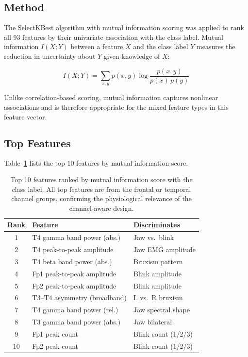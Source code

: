 \subsection{Method}

The SelectKBest algorithm with mutual information scoring
was applied to rank all 93 features by their univariate
association with the class label. Mutual information
$I(X; Y)$ between a feature $X$ and the class label $Y$
measures the reduction in uncertainty about $Y$ given
knowledge of $X$:

\begin{equation}
I(X; Y) = \sum_{x, y} p(x, y) \log
\frac{p(x, y)}{p(x)\,p(y)}
\label{eq:mutual_info}
\end{equation}

Unlike correlation-based scoring, mutual information
captures nonlinear associations and is therefore appropriate
for the mixed feature types in this feature vector.

\subsection{Top Features}

Table~\ref{tab:top_features} lists the top 10 features by
mutual information score.

\begin{table}[htbp]
\centering
\caption{Top 10 features ranked by mutual information score
with the class label. All top features are from the frontal
or temporal channel groups, confirming the physiological
relevance of the channel-aware design.}
\label{tab:top_features}
\renewcommand{\arraystretch}{1.3}
\begin{tabular}{c p{4.5cm} p{3.0cm}}
\toprule
\textbf{Rank} & \textbf{Feature} & \textbf{Discriminates} \\
\midrule
1  & T4 gamma band power (abs.)    & Jaw vs.\ blink \\
2  & T4 peak-to-peak amplitude     & Jaw EMG amplitude \\
3  & T4 beta band power (abs.)     & Bruxism pattern \\
4  & Fp1 peak-to-peak amplitude    & Blink amplitude \\
5  & Fp2 peak-to-peak amplitude    & Blink amplitude \\
6  & T3--T4 asymmetry (broadband)  & L vs.\ R bruxism \\
7  & T4 gamma band power (rel.)    & Jaw spectral shape \\
8  & T3 gamma band power (abs.)    & Jaw bilateral \\
9  & Fp1 peak count                & Blink count (1/2/3) \\
10 & Fp2 peak count                & Blink count (1/2/3) \\
\bottomrule
\end{tabular}
\end{table}


